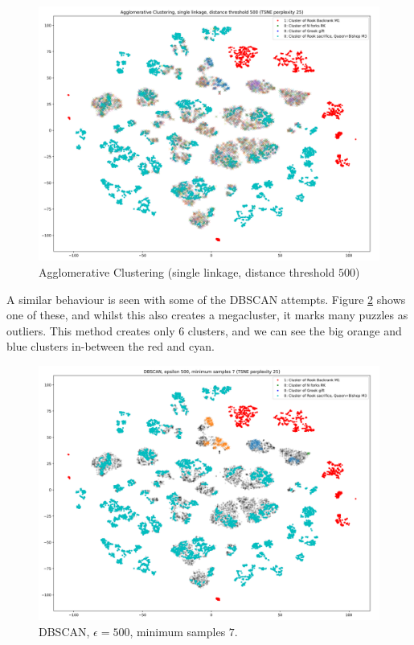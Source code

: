 \begin{figure}[H]
  \centering
  \includegraphics[width=\textwidth]{project/img/tsne/ac_25.png}
  \caption{Agglomerative Clustering (single linkage, distance threshold $500$)}
  \label{tsne1}
\end{figure}

A similar behaviour is seen with some of the DBSCAN attempts. Figure
\ref{tsne2} shows one of these, and whilst this also creates a megacluster, it
marks many puzzles as outliers. This method creates only 6 clusters, and we can
see the big orange and blue clusters in-between the red and cyan.

\begin{figure}[H]
  \centering
  \includegraphics[width=\textwidth]{project/img/tsne/dbscan_500_25.png}
  \caption{DBSCAN, $\epsilon=500$, minimum samples $7$.}
  \label{tsne2}
\end{figure}

